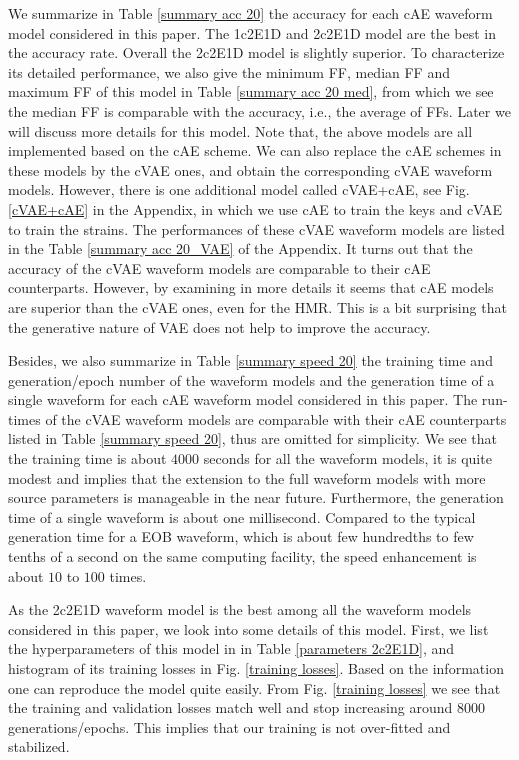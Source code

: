 \documentclass[twocolumn,prd,superscriptaddress,nofootinbib]{revtex4-1}
\begin{document}
We summarize in Table \ref{summary acc 20} the accuracy for each cAE waveform model considered in this paper. The 1c2E1D and 2c2E1D model are the best in the accuracy rate. Overall the 2c2E1D model is slightly superior. To characterize its detailed performance, we also give the minimum FF, median FF and maximum FF of this model in Table \ref{summary acc 20 med}, from which we see the median FF is comparable with the accuracy, i.e., the average of FFs. Later we will discuss more details for this model.  Note that, the above models are all implemented based on the cAE scheme.  We can also replace the cAE schemes in these models by the cVAE ones, and obtain the corresponding cVAE waveform models. However, there is one additional model called cVAE+cAE, see Fig. \ref{cVAE+cAE} in the Appendix, in which we use cAE to train the keys and cVAE to train the strains.  The performances of these cVAE waveform models are listed in the Table \ref{summary acc 20_VAE} of the Appendix. It turns out that the accuracy of the cVAE waveform models are comparable to their cAE counterparts. However, by examining in more details it seems that cAE models are superior than the cVAE ones, even for the HMR. This is a bit surprising that the generative nature of VAE does not help to improve the accuracy. 



Besides, we also summarize in Table \ref{summary speed 20} the training time and generation/epoch number of the waveform models and the generation time of a single waveform  for each cAE waveform model considered in this paper. 
The run-times of the cVAE waveform models are comparable with their cAE counterparts listed in Table \ref{summary speed 20}, thus are omitted for simplicity. We see that the training time is about $4000$ seconds for all the waveform models, it is quite modest and implies that the extension to the full waveform models with more source parameters is manageable in the near future. Furthermore, the generation time of a single waveform is about one millisecond. Compared to the typical generation time for a EOB waveform, which is about few hundredths to few tenths of a second on the same computing facility, the speed enhancement is about $10$ to $100$ times.  


As the 2c2E1D waveform model is the best among all the waveform models considered in this paper, we look into some details of this model. First, we list the hyperparameters of this model in in Table \ref{parameters 2c2E1D}, and histogram of its training losses in Fig. \ref{training losses}. Based on the information one can reproduce the model quite easily. From Fig. \ref{training losses} we see that the training and validation losses match well and stop increasing around $8000$ generations/epochs. This implies that our training is not over-fitted and stabilized. 
\end{document}
